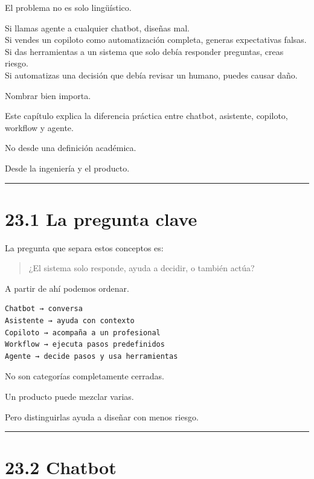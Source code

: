 El problema no es solo lingüístico.

Si llamas agente a cualquier chatbot, diseñas mal.\\
Si vendes un copiloto como automatización completa, generas expectativas
falsas.\\
Si das herramientas a un sistema que solo debía responder preguntas,
creas riesgo.\\
Si automatizas una decisión que debía revisar un humano, puedes causar
daño.

Nombrar bien importa.

Este capítulo explica la diferencia práctica entre chatbot, asistente,
copiloto, workflow y agente.

No desde una definición académica.

Desde la ingeniería y el producto.

\begin{center}\rule{0.5\linewidth}{0.5pt}\end{center}

\section{23.1 La pregunta clave}\label{la-pregunta-clave}

La pregunta que separa estos conceptos es:

\begin{quote}
¿El sistema solo responde, ayuda a decidir, o también actúa?
\end{quote}

A partir de ahí podemos ordenar.

\begin{lstlisting}
Chatbot → conversa
Asistente → ayuda con contexto
Copiloto → acompaña a un profesional
Workflow → ejecuta pasos predefinidos
Agente → decide pasos y usa herramientas
\end{lstlisting}

No son categorías completamente cerradas.

Un producto puede mezclar varias.

Pero distinguirlas ayuda a diseñar con menos riesgo.

\begin{center}\rule{0.5\linewidth}{0.5pt}\end{center}

\section{23.2 Chatbot}\label{chatbot-1}


